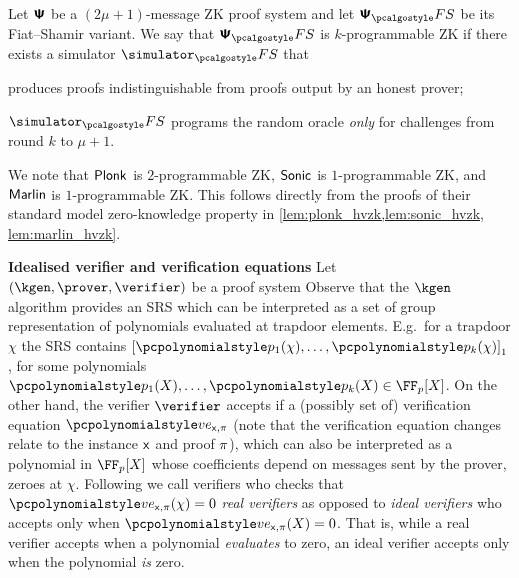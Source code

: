 \documentclass[runningheads,11pt]{llncs}
\newcommand{\oursubsub}[1] {\smallskip\noindent\textbf{#1}}
\begin{document}
\begin{definition}[$k$-programmable ZK]
  \label{def:kzk}
  Let $\bm{\mathsf{\Psi}}$ be a $(2\mu + 1)$-message ZK proof system and let $\ps_\fs$ be its
  Fiat--Shamir variant. We say that $\ps_\fs$ is $k$-programmable ZK if there
  exists a simulator $\simulator_\fs$ that
  \begin{compactenum}
  \item produces proofs indistinguishable from proofs output by an honest
    prover;
  \item $\simulator_\fs$ programs the random oracle \emph{only} for
    challenges from round $k$ to $\mu + 1$.
  \end{compactenum}
\end{definition}
We note that $\textnormal{\textsf{Plonk}}$ is $2$-programmable ZK, ${\textnormal{\textsf{Sonic}}}$ is $1$-programmable ZK,
and ${\textnormal{\textsf{Marlin}}}$ is $1$-programmable ZK. This follows directly from the proofs of
their standard model zero-knowledge property in
\cref{lem:plonk_hvzk,lem:sonic_hvzk, lem:marlin_hvzk}. 

\oursubsub{Idealised verifier and verification equations} Let
$(\kgen, \prover, \verifier)$ be a proof system
Observe that the $\kgen$ algorithm provides an SRS which can be interpreted as a
set of group representation of polynomials evaluated at trapdoor
elements. E.g.~for a trapdoor $\chi$ the SRS contains
$\gone{\p{p_1}(\chi), \ldots, \p{p_k}(\chi)}$, for some polynomials
$\p{p_1}(X), \ldots, \p{p_k}(X) \in \FF_p[X]$. On the other hand, the verifier
$\verifier$ accepts if a (possibly set of) verification equation
$\vereq_{\inp, \zkproof}$ (note that the verification equation changes relate to
the instance $\mathsf{x}$ and proof $\pi$), which can also be interpreted as a
polynomial in $\FF_p[X]$ whose coefficients depend on messages sent by the
prover, zeroes at $\chi$. Following \cite{EPRINT:GabWilCio19} we call verifiers
who checks that $\vereq_{\inp, \zkproof}(\chi) = 0$ \emph{real verifiers} as
opposed to \emph{ideal verifiers} who accepts only when
$\vereq_{\inp, \zkproof}(X) = 0$. That is, while a real verifier accepts when a
polynomial \emph{evaluates} to zero, an ideal verifier accepts only when the
polynomial \emph{is} zero.
\end{document}
